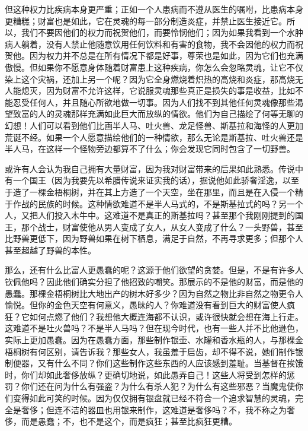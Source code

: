 但这种权力比疾病本身更严重；正如一个人患病而不遵从医生的嘱咐，比患病本身更糟糕；财富也是如此，它在灵魂的每一部分制造炎症，并禁止医生接近它。所以，我们不要因他们的权力而祝贺他们，而要怜悯他们；因为如果我看到一个水肿病人躺着，没有人禁止他随意饮用任何饮料和有害的食物，我不会因他的权力而祝贺他。因为权力并不总是在所有情况下都是好事，尊荣也是如此，因为它们也充满傲慢。但如果你不愿意身体随着财富患上这种疾病，你怎么会忽略灵魂，让它不仅染上这个灾祸，还加上另一个呢？因为它全身燃烧着炽热的高烧和炎症，那高烧无人能熄灭，因为财富不允许这样，它说服灵魂那些真正是损失的事是收益，比如不能忍受任何人，并且随心所欲地做一切事。因为人们找不到其他任何灵魂像那些渴望致富的人的灵魂那样充满如此巨大而放纵的情欲。他们为自己描绘了何等无聊的幻想！人们可以看到他们比画半人马、吐火兽、龙足怪兽、斯基拉和海怪的人更加荒诞不经。如果一个人愿意描绘他们的一种情欲，那么无论是斯基拉、吐火兽还是半人马，在这样一个怪物旁边都算不了什么；你会发现它同时包含了一切野兽。\par

或许有人会认为我自己拥有大量财富，因为我对财富带来的后果如此熟悉。传说中有一个国王（因为我要先以希腊传说来证实我的话），据说他如此骄奢淫逸，以至于造了一棵金梧桐树，并在其上方造了一个天空，坐在那里，而且是在入侵一个精于作战的民族的时候。这种情欲难道不是半人马式的，不是斯基拉式的吗？另一个人，又把人们投入木牛中。这难道不是真正的斯基拉吗？甚至那个我刚刚提到的国王，那个战士，财富使他从男人变成了女人，从女人变成了什么？一头野兽，甚至比野兽更低下，因为野兽如果在树下栖息，满足于自然，不再寻求更多；但那个人甚至超越了野兽的本性。\par

那么，还有什么比富人更愚蠢的呢？这源于他们欲望的贪婪。但是，不是有许多人钦佩他吗？因此他们确实分担了他招致的嘲笑。那展示的不是他的财富，而是他的愚蠢。那棵金梧桐树比大地出产的树木好多少？因为自然之物比非自然之物更令人愉悦。但你的金色天空有何意义，愚昧的人？你难道没有看到巨大的财富使人疯狂？它如何点燃了他们？我想他大概连海都不认识，或许很快就会想在海上行走。这难道不是吐火兽吗？不是半人马吗？但在现今时代，也有一些人并不比他逊色，实际上更加愚蠢。因为在愚蠢方面，那些制作银壶、水罐和香水瓶的人，与那棵金梧桐树有何区别，请告诉我？那些女人，我虽羞于启齿，却不得不说，她们制作银制便器，又有什么不同？你们这些制作这些东西的人应该感到羞耻。当基督在挨饿时，你们却如此奢侈放纵？更确切地说，如此愚弄自己！这些人将受到怎样的惩罚？你们还在问为什么有强盗？为什么有杀人犯？为什么有这些邪恶？当魔鬼使你们变得如此可笑的时候。因为仅仅拥有银盘就已经不符合一个追求智慧的灵魂，完全是奢侈；但连不洁的器皿也用银来制作，这难道是奢侈吗？不，我不称之为奢侈，而是愚蠢；不，也不是这个，而是疯狂；甚至比疯狂更糟。\par

